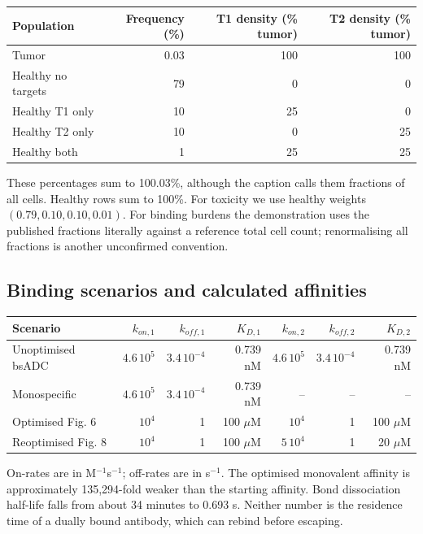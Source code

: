 \documentclass[11pt,a4paper]{article}
\begin{document}
\begin{center}\begin{tabular}{lrrr}\toprule
Population & Frequency (\%) & T1 density (\% tumor) & T2 density (\% tumor)\\\midrule
Tumor & 0.03 &100&100\\
Healthy no targets &79&0&0\\
Healthy T1 only &10&25&0\\
Healthy T2 only &10&0&25\\
Healthy both &1&25&25\\\bottomrule
\end{tabular}\end{center}
These percentages sum to 100.03\%, although the caption calls them fractions of all cells. Healthy rows sum to 100\%. For toxicity we use healthy weights $(0.79,0.10,0.10,0.01)$. For binding burdens the demonstration uses the published fractions literally against a reference total cell count; renormalising all fractions is another unconfirmed convention.

\subsection{Binding scenarios and calculated affinities}
\begin{center}\small\begin{tabular}{lrrrrrr}\toprule
Scenario & $k_{on,1}$ & $k_{off,1}$ & $K_{D,1}$ & $k_{on,2}$ & $k_{off,2}$ & $K_{D,2}$\\\midrule
Unoptimised bsADC & $4.6\,10^5$ & $3.4\,10^{-4}$ & 0.739 nM & $4.6\,10^5$ & $3.4\,10^{-4}$ &0.739 nM\\
Monospecific & $4.6\,10^5$ & $3.4\,10^{-4}$ &0.739 nM &--&--&--\\
Optimised Fig. 6 & $10^4$ &1&100 $\mu$M &$10^4$&1&100 $\mu$M\\
Reoptimised Fig. 8 & $10^4$ &1&100 $\mu$M &$5\,10^4$&1&20 $\mu$M\\\bottomrule
\end{tabular}\end{center}
On-rates are in M$^{-1}$s$^{-1}$; off-rates are in s$^{-1}$. The optimised monovalent affinity is approximately 135,294-fold weaker than the starting affinity. Bond dissociation half-life falls from about 34 minutes to 0.693 s. Neither number is the residence time of a dually bound antibody, which can rebind before escaping.
\end{document}
